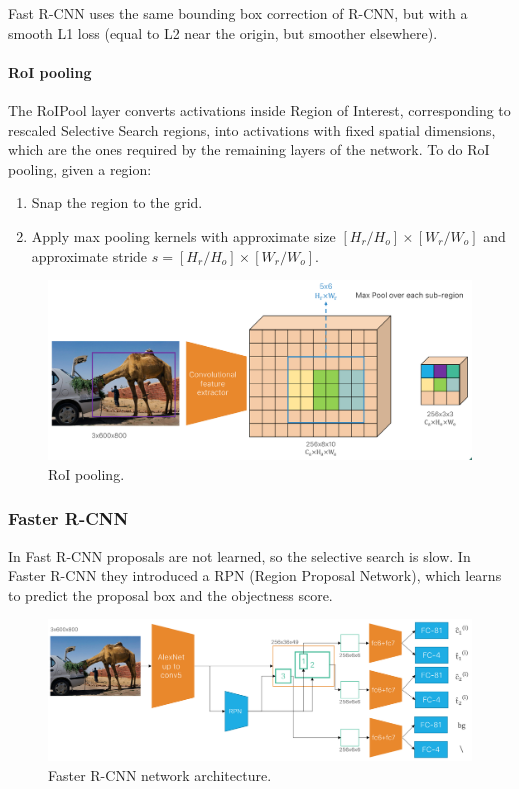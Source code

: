 \documentclass{article}
\begin{document}
Fast R-CNN uses the same bounding box correction of R-CNN, but with a smooth L1 loss (equal to L2 near the origin, but smoother elsewhere).

\paragraph{RoI pooling}
The RoIPool layer converts activations inside Region of Interest, corresponding to rescaled Selective Search regions, into activations with fixed spatial dimensions, which are the ones required by the remaining layers of the network.
To do RoI pooling, given a region:
\begin{enumerate}
  \item Snap the region to the grid.
  \item Apply max pooling kernels with approximate size $[H_r/H_o]\times [W_r/W_o]$ and approximate stride $s = [H_r/H_o]\times[W_r/W_o]$.
\end{enumerate}

\begin{figure}[htbp]
  \centering
  \includegraphics[width=0.6\linewidth]{./img/roipool.png}
  \caption{RoI pooling.}
\end{figure}

\subsubsection{Faster R-CNN}

In Fast R-CNN proposals are not learned, so the selective search is slow.
In Faster R-CNN they introduced a RPN (Region Proposal Network), which learns to predict the proposal box and the objectness score.

\begin{figure}[htbp]
  \centering
  \includegraphics[width=0.6\linewidth]{./img/fasterrcnn.png}
  \caption{Faster R-CNN network architecture.}
\end{figure}
\end{document}
